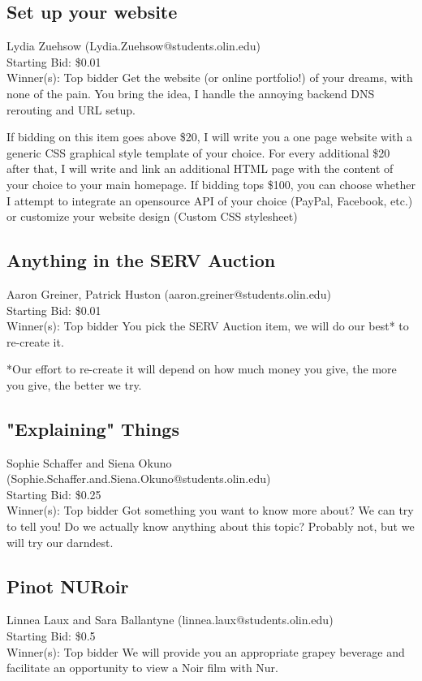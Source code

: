 \documentclass[11pt]{article}
\begin{document}
\subsection{Set up your website}
Lydia Zuehsow (Lydia.Zuehsow@students.olin.edu) \\
Starting Bid: \$0.01 \\
Winner(s): 
Top bidder\newline
Get the website (or online portfolio!) of your dreams, with none of the pain.
You bring the idea, I handle the annoying backend DNS rerouting and URL setup.

If bidding on this item goes above \$20, I will write you a one page website with a generic CSS graphical style template of your choice.
For every additional \$20 after that, I will write and link an additional HTML page with the content of your choice to your main homepage.
If bidding tops \$100, you can choose whether I attempt to integrate an opensource API of your choice (PayPal, Facebook, etc.) or customize your website design (Custom CSS stylesheet)
\subsection{Anything in the SERV Auction}
Aaron Greiner, Patrick Huston (aaron.greiner@students.olin.edu) \\
Starting Bid: \$0.01 \\
Winner(s): 
Top bidder\newline
You pick the SERV Auction item, we will do our best* to re-create it.

*Our effort to re-create it will depend on how much money you give, the more you give, the better we try.
\subsection{"Explaining" Things}
Sophie Schaffer and Siena Okuno (Sophie.Schaffer.and.Siena.Okuno@students.olin.edu) \\
Starting Bid: \$0.25 \\
Winner(s): 
Top bidder\newline
Got something you want to know more about? We can try to tell you! Do we actually know anything about this topic? Probably not, but we will try our darndest.
\subsection{Pinot NURoir}
Linnea Laux and Sara Ballantyne (linnea.laux@students.olin.edu) \\
Starting Bid: \$0.5 \\
Winner(s): 
Top bidder\newline
We will provide you an appropriate grapey beverage and facilitate an opportunity to view a Noir film with Nur.
\end{document}
